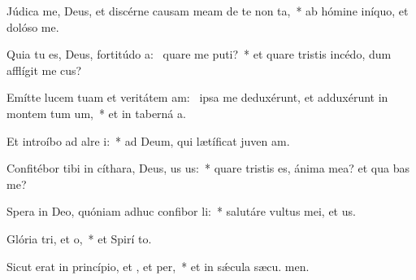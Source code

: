 \item Júdica me, Deus, et discérne causam meam de te non ta,~* ab hómine iníquo, et dolóso  me.
\item Quia tu es, Deus, fortitúdo a:~\pscross{} quare me puti?~* et quare tristis incédo, dum afflígit me cus?
\item Emítte lucem tuam et veritátem am:~\pscross{} ipsa me deduxérunt, et adduxérunt in montem tum um,~* et in taberná a.
\item Et introíbo ad alre i:~* ad Deum, qui lætíficat juven am.
\item Confitébor tibi in cíthara, Deus, us us:~* quare tristis es, ánima mea? et qua bas me?
\item Spera in Deo, quóniam adhuc confibor li:~* salutáre vultus mei, et  us.
\item Glória tri, et o,~* et Spirí to.
\item Sicut erat in princípio, et , et per,~* et in sǽcula sæcu. men.
